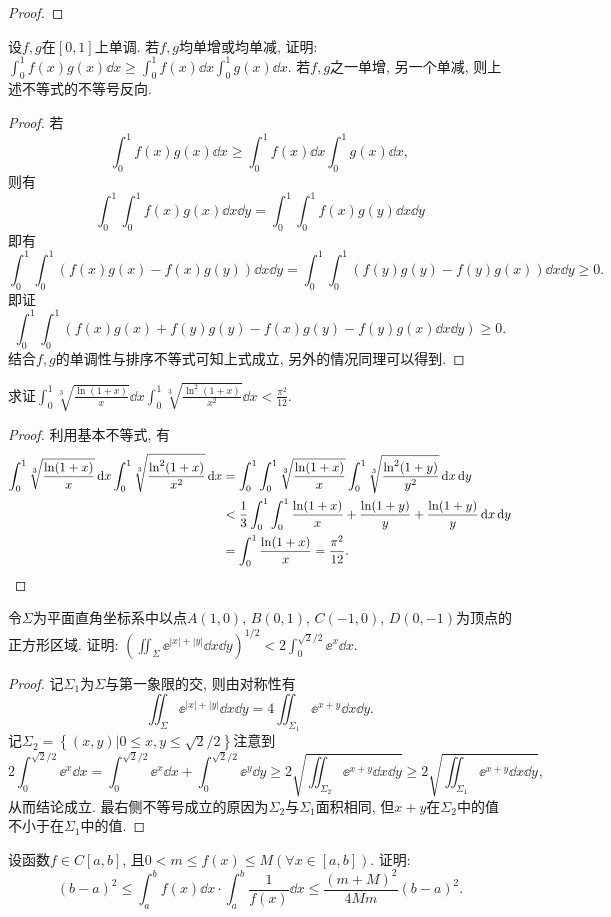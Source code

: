 \begin{quiza}
\begin{proof}
\end{proof}
\woe 设\(f,g\)在\([0,1]\)上单调. 若\(f,g\)均单增或均单减, 证明: \(\int_0^1f(x)g(x)\dd x\geqslant\int_{0}^{1}f(x)\dd x\int_{0}^{1}g(x)\dd x\). 若\(f,g\)之一单增, 另一个单减, 则上述不等式的不等号反向.
\begin{proof}
若\[\int_{0}^{1}f(x)g(x)\dd x\geqslant\int_{0}^{1}f(x)\dd x\int_{0}^{1}g(x)\dd x,\]则有\[\int_{0}^{1}\int_{0}^{1}f(x)g(x)\dd x\dd y=\int_{0}^{1}\int_{0}^{1}f(x)g(y)\dd x\dd y\]即有\[\int_{0}^{1}\int_{0}^{1}\left(f(x)g(x)-f(x)g(y)\right)\dd x\dd y=\int_{0}^{1}\int_{0}^{1}\left(f(y)g(y)-f(y)g(x)\right)\dd x\dd y\geqslant 0.\]即证\[\int_{0}^{1}\int_{0}^{1}\left(f(x)g(x)+f(y)g(y)-f(x)g(y)-f(y)g(x)\dd x\dd y\right)\geqslant 0.\]结合\(f,g\)的单调性与排序不等式可知上式成立, 另外的情况同理可以得到.
\end{proof}
\woe 求证\(\int_{0}^{1}\sqrt[3]{\frac{\ln(1+x)}{x}}\dd x\int_{0}^{1}\sqrt[3]{\frac{\ln^2(1+x)}{x^2}}\dd x<\frac{\pi^2}{12}\).
\begin{proof}
利用基本不等式, 有\[\begin{split}
\int_{0}^{1}\sqrt[3]{\frac{\ln (1+x)}{x}}\,\mathrm{d} x\int_{0}^{1}\sqrt[3]{\frac{\ln^2(1+x)}{x^2}}\,\mathrm{d} x&=\int_{0}^{1}\int_{0}^{1}\sqrt[3]{\frac{\ln (1+x)}{x}}\int_{0}^{1}\sqrt[3]{\frac{\ln^2(1+y)}{y^2}}\,\mathrm{d} x\,\mathrm{d} y\\&<\frac{1}{3}\int_{0}^{1}\int_{0}^{1}\frac{\ln(1+x)}{x}+\frac{\ln(1+y)}{y}+\frac{\ln(1+y)}{y}\,\mathrm{d} x\,\mathrm{d} y\\&=\int_{0}^{1}\frac{\ln(1+x)}{x}=\frac{\pi^2}{12}.\qedhere
\end{split}\]
\end{proof}
\woe 令\(\varSigma\)为平面直角坐标系中以点\(A(1,0),\,B(0,1),\,C(-1,0),\,D(0,-1)\)为顶点的正方形区域. 证明: \(\left(\iint_\varSigma\ee^{|x|+|y|}\dd x\dd y\right)^{1/2}<2\int_{0}^{\sqrt{2}/2}\ee^x\dd x\).
\begin{proof}
记\(\varSigma_1\)为\(\varSigma\)与第一象限的交, 则由对称性有\[\iint_\varSigma\ee^{|x|+|y|}\dd x\dd y=4\iint_{\varSigma_1}\ee^{x+y}\dd x\dd y.\]记\(\varSigma_2=\left\lbrace(x,y)\big|0\leqslant x,y\leqslant\sqrt{2}/2\right\rbrace\)注意到\[2\int_{0}^{\sqrt{2}/2}\ee^x\dd x=\int_{0}^{\sqrt{2}/2}\ee^x\dd x+\int_{0}^{\sqrt{2}/2}\ee^y\dd y\geqslant 2\sqrt{\iint_{\varSigma_2}\ee^{x+y}\dd x\dd y}\geqslant 2\sqrt{\iint_{\varSigma_1}\ee^{x+y}\dd x\dd y},\]从而结论成立. 最右侧不等号成立的原因为\(\varSigma_2\)与\(\varSigma_1\)面积相同, 但\(x+y\)在\(\varSigma_2\)中的值不小于在\(\varSigma_1\)中的值.
\end{proof}
\woe 设函数\(f\in C[a,b]\), 且\(0<m\leqslant f(x)\leqslant M(\forall x\in[a,b])\). 证明:\[(b-a)^2\leqslant\int_{a}^{b}f(x)\dd x\cdot\int_{a}^{b}\frac{1}{f(x)}\dd x\leqslant\frac{(m+M)^2}{4Mm}(b-a)^2.\]

\end{quiza}

